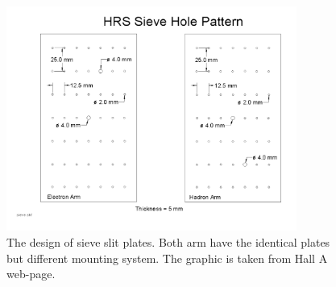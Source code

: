 \begin{figure}[!ht]
  \begin{center}
    \includegraphics[type=pdf,ext=.pdf,read=.pdf,width=0.85\textwidth]{./figures/optics/sieve}
    \caption[Design of sieve slit plates]{\footnotesize{The design of sieve slit plates. Both arm have the identical plates but different mounting system. The graphic is taken from Hall A web-page.}}
    \label{sieve_slit}
  \end{center}
\end{figure}

